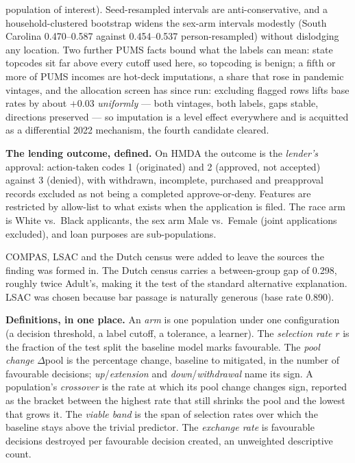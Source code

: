 \documentclass[9pt,conference]{IEEEtran}
\begin{document}
population of interest). Seed-resampled intervals are anti-conservative, and a
household-clustered bootstrap widens the sex-arm intervals modestly (South Carolina
0.470--0.587 against 0.454--0.537 person-resampled) without dislodging any location.
Two further PUMS facts bound what the labels can mean: state topcodes sit far above
every cutoff used here, so topcoding is benign; a fifth or more of PUMS incomes are
hot-deck imputations, a share that rose in pandemic vintages, and the allocation screen
has since run: excluding flagged rows lifts base rates by about $+0.03$
\emph{uniformly} --- both vintages, both labels, gaps stable, directions preserved ---
so imputation is a level effect everywhere and is acquitted as a differential 2022
mechanism, the fourth candidate cleared.

\textbf{The lending outcome, defined.} On HMDA the outcome is the \emph{lender's}
approval: action-taken codes 1 (originated) and 2 (approved, not accepted) against 3
(denied), with withdrawn, incomplete, purchased and preapproval records excluded as not being
a completed approve-or-deny. Features are restricted by allow-list to what exists when the
application is filed. The race arm is White vs.\ Black applicants, the sex arm Male vs.\
Female (joint applications excluded), and loan purposes are sub-populations.

COMPAS, LSAC and the Dutch census were added to leave the sources the finding was formed
in. The Dutch census
carries a between-group gap of 0.298, roughly twice Adult's, making it the test of the standard
alternative explanation. LSAC was chosen because bar passage is naturally generous (base rate
0.890).

\textbf{Definitions, in one place.} An \emph{arm} is one population under one
configuration (a decision threshold, a label cutoff, a tolerance, a learner). The
\emph{selection rate} $r$ is the fraction of the test split the baseline model marks
favourable. The \emph{pool change} $\Delta$pool is the percentage change, baseline to
mitigated, in the number of favourable decisions; \emph{up}/\emph{extension} and
\emph{down}/\emph{withdrawal} name its sign. A population's \emph{crossover} is the rate
at which its pool change changes sign, reported as the bracket between the highest rate
that still shrinks the pool and the lowest that grows it. The \emph{viable band} is the
span of selection rates over which the baseline stays above the trivial predictor. The
\emph{exchange rate} is favourable decisions destroyed per favourable decision created,
an unweighted descriptive count.
\end{document}
